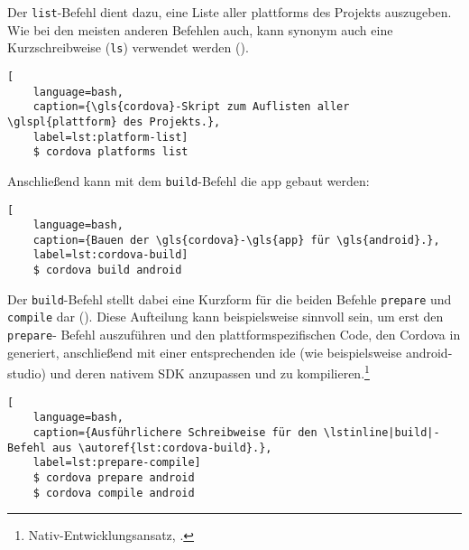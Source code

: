 {Der \lstinline|list|-Befehl dient dazu, eine Liste aller \glspl{plattform} des Projekts auszugeben. Wie bei den meisten anderen Befehlen auch, kann synonym auch eine Kurzschreibweise (\lstinline|ls|) verwendet werden ().

\par\noindent\begin{minipage}{\linewidth}
\begin{lstlisting}[
	language=bash,
	caption={\gls{cordova}-Skript zum Auflisten aller \glspl{plattform} des Projekts.},
	label=lst:platform-list]
	$ cordova platforms list
\end{lstlisting}
\end{minipage}\par\addvspace{\topskip}

\par\noindent\begin{minipage}{\linewidth}
Anschließend kann mit dem \lstinline|build|-Befehl die \gls{app} gebaut werden:
\begin{lstlisting}[
	language=bash,
	caption={Bauen der \gls{cordova}-\gls{app} für \gls{android}.},
	label=lst:cordova-build]
	$ cordova build android
\end{lstlisting}
\end{minipage}\par\addvspace{\topskip}

Der \lstinline|build|-Befehl stellt dabei eine Kurzform für die beiden Befehle \lstinline|prepare| und  \lstinline|compile| dar ().
Diese Aufteilung kann beispielsweise sinnvoll sein, um erst den \lstinline|prepare|- Befehl auszuführen und den plattformspezifischen Code, den Cordova in  generiert, anschließend mit einer entsprechenden \gls{ide} (wie beispielsweise \gls{android-studio}) und deren nativem SDK anzupassen und zu kompilieren.\footnote{\vgl Nativ-Entwicklungsansatz, \so.}

\par\noindent\begin{minipage}{\linewidth}
\begin{lstlisting}[
	language=bash,
	caption={Ausführlichere Schreibweise für den \lstinline|build|-Befehl aus \autoref{lst:cordova-build}.},
	label=lst:prepare-compile]
	$ cordova prepare android
	$ cordova compile android
\end{lstlisting}
\end{minipage}\par\addvspace{\topskip}

}
